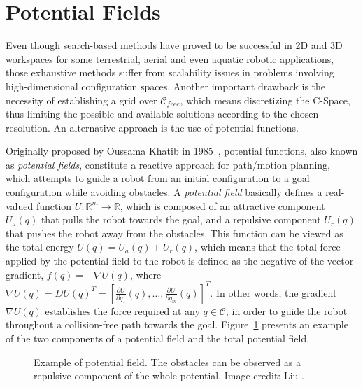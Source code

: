\section{Potential Fields}
\label{sec:PotenFields}

Even though search-based methods have proved to be successful in \ac{2D} and
\ac{3D} workspaces for some terrestrial, aerial and even aquatic robotic
applications, those exhaustive methods suffer from scalability issues in
problems involving high-dimensional configuration spaces. Another important
drawback is the necessity of establishing a grid over $\mathcal{C}_{free}$,
which means discretizing the \ac{C-Space}, thus limiting the possible and
available solutions according to the chosen resolution. An alternative approach
is the use of potential functions.

Originally proposed by Oussama Khatib in 1985~\cite{Khatib1985,Khatib1986},
potential functions, also known as \textit{potential fields}, constitute a
reactive approach for path/motion planning, which attempts to guide a robot from
an initial configuration to a goal configuration while avoiding obstacles. A
\textit{potential field} basically defines a real-valued function $U:
\mathbb{R}^m \rightarrow \mathbb{R}$, which is composed of an attractive
component $U_a(q)$ that pulls the robot towards the goal, and a repulsive
component $U_r(q)$ that pushes the robot away from the obstacles. This function
can be viewed as the total energy $U(q) = U_a(q) + U_r(q)$, which means that the
total force applied by the potential field to the robot is defined as the
negative of the vector gradient, \ie $f(q) = -\nabla U(q)$, where $\nabla U(q) =
DU(q)^T = \left[ \frac{\partial U}{\partial q_1}(q), \ldots, \frac{\partial
U}{\partial q_m}(q) \right]^T$. In other words, the gradient $\nabla U(q)$
establishes the force required at any $q \in \mathcal{C}$, in order to guide the
robot throughout a collision-free path towards the goal.
Figure~\ref{fig:potential-field} presents an example of the two components of a
potential field and the total potential field.


\begin{figure}[htbp]
    \myfloatalign
     \quad
\caption[Example of potential field.]
{Example of potential field. The obstacles can be observed as a repulsive
component of the whole potential. Image credit: Liu \etal\cite{Liu2016}.}
\label{fig:potential-field}
\end{figure}

